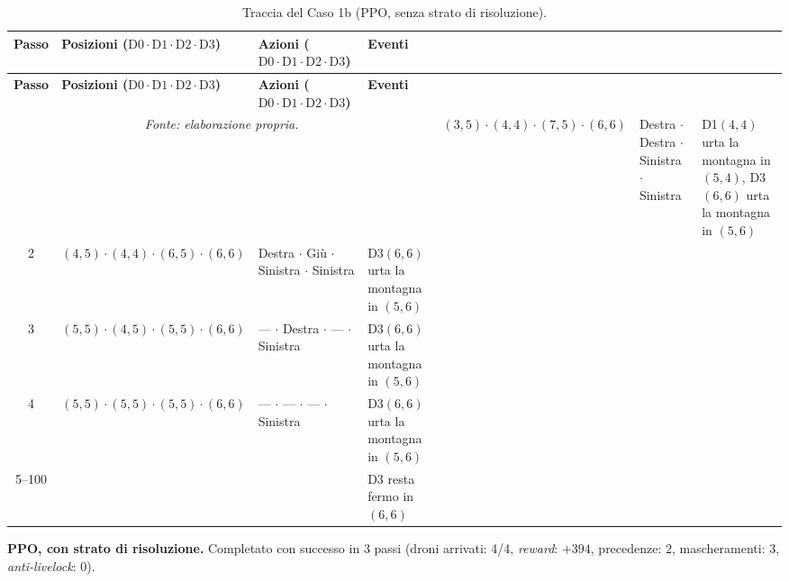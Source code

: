 \documentclass[12pt,a4paper,twoside]{report}
\begin{document}
{\footnotesize
\setlength{\tabcolsep}{3.5pt}
\begin{longtable}{c l l >{\raggedright\arraybackslash}p{3.8cm}}
\caption{Traccia del Caso 1b (PPO, senza strato di risoluzione).}\\
\toprule
\textbf{Passo} & \textbf{Posizioni ($\text{D0} \cdot \text{D1} \cdot \text{D2} \cdot \text{D3}$)} & \textbf{Azioni ($\text{D0} \cdot \text{D1} \cdot \text{D2} \cdot \text{D3}$)} & \textbf{Eventi} \\
\midrule
\endfirsthead
\toprule
\textbf{Passo} & \textbf{Posizioni ($\text{D0} \cdot \text{D1} \cdot \text{D2} \cdot \text{D3}$)} & \textbf{Azioni ($\text{D0} \cdot \text{D1} \cdot \text{D2} \cdot \text{D3}$)} & \textbf{Eventi} \\
\midrule
\endhead
\bottomrule
\multicolumn{4}{c}{\footnotesize\emph{Fonte: elaborazione propria.}}
\endlastfoot
1      & $(3, 5) \cdot (4, 4) \cdot (7, 5) \cdot (6, 6)$ & Destra $\cdot$ Destra $\cdot$ Sinistra $\cdot$ Sinistra & D1$(4, 4)$ urta la montagna in $(5, 4)$, D3$(6, 6)$ urta la montagna in $(5, 6)$ \\
2      & $(4, 5) \cdot (4, 4) \cdot (6, 5) \cdot (6, 6)$ & Destra $\cdot$ Giù $\cdot$ Sinistra $\cdot$ Sinistra    & D3$(6, 6)$ urta la montagna in $(5, 6)$ \\
3      & $(5, 5) \cdot (4, 5) \cdot (5, 5) \cdot (6, 6)$ & --- $\cdot$ Destra $\cdot$ --- $\cdot$ Sinistra         & D3$(6, 6)$ urta la montagna in $(5, 6)$ \\
4      & $(5, 5) \cdot (5, 5) \cdot (5, 5) \cdot (6, 6)$ & --- $\cdot$ --- $\cdot$ --- $\cdot$ Sinistra            & D3$(6, 6)$ urta la montagna in $(5, 6)$ \\*
5--100 & & & D3 resta fermo in $(6, 6)$ \\*
\end{longtable}
}
\newpage
\noindent\textbf{PPO, con strato di risoluzione.} Completato con successo in $3$ passi (droni arrivati: 4/4, \emph{reward}: $+394$, precedenze: $2$, mascheramenti: $3$, \emph{anti-livelock}: $0$).
\end{document}
